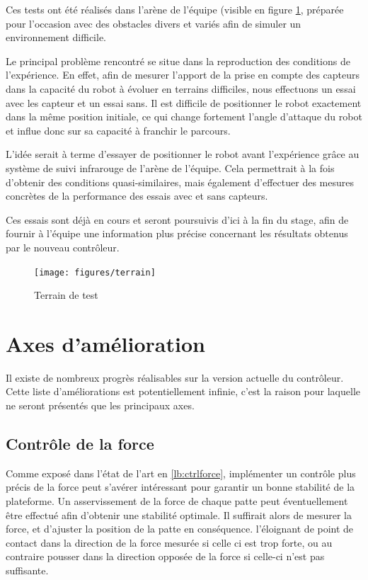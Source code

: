 \documentclass{tnreport}
\begin{document}
Ces tests ont été réalisés dans l'arène de l'équipe (visible en figure \ref{fig:arene}, préparée pour l'occasion avec des obstacles divers et variés afin de simuler un environnement difficile. 

Le principal problème rencontré se situe dans la reproduction des conditions de l'expérience. En effet, afin de mesurer l'apport de la prise en compte des capteurs dans la capacité du robot à évoluer en terrains difficiles, nous effectuons un essai avec les capteur et un essai sans. Il est difficile de positionner le robot exactement dans la même position initiale, ce qui change fortement l'angle d'attaque du robot et influe donc sur sa capacité à franchir le parcours.

L'idée serait à terme d'essayer de positionner le robot avant l'expérience grâce au système de suivi infrarouge de l'arène de l'équipe. Cela permettrait à la fois d'obtenir des conditions quasi-similaires, mais également d'effectuer des mesures concrètes de la performance des essais avec et sans capteurs. 

Ces essais sont déjà en cours et seront poursuivis d'ici à la fin du stage, afin de fournir à l'équipe une information plus précise concernant les résultats obtenus par le nouveau contrôleur. 

\begin{figure}
    \centering
    \texttt{[image: figures/terrain]}
    \caption{Terrain de test}
    \label{fig:arene}
\end{figure}

\section{Axes d'amélioration}
Il existe de nombreux progrès réalisables sur la version actuelle du contrôleur. Cette liste d'améliorations est potentiellement infinie, c'est la raison pour laquelle ne seront présentés que les principaux axes.

\subsection{Contrôle de la force}
Comme exposé dans l'état de l'art en \ref{lb:ctrlforce}, implémenter un contrôle plus précis de la force peut s'avérer intéressant pour garantir un bonne stabilité de la plateforme. Un asservissement de la force de chaque patte peut éventuellement être effectué afin d'obtenir une stabilité optimale. Il suffirait alors de mesurer la force, et d'ajuster la position de la patte en conséquence. l'éloignant de point de contact dans la direction de la force mesurée si celle ci est trop forte, ou au contraire pousser dans la direction opposée de la force si celle-ci n'est pas suffisante. 
\end{document}
